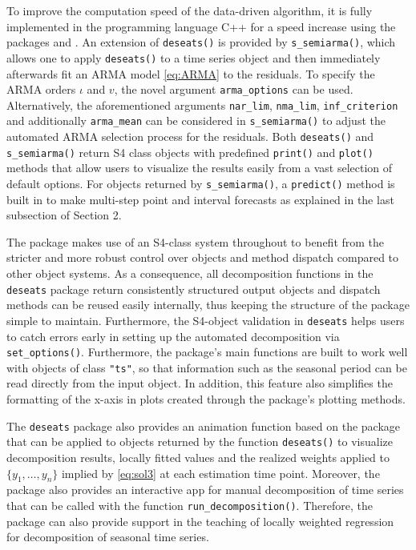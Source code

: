 To improve the computation speed of the data-driven algorithm, it is fully implemented in the programming language C++ for a speed increase using the packages  \citep{eddelbuettel2011rcpp} and  \citep{eddelbuettel2014armadillo}. An extension of \texttt{deseats()} is provided by \texttt{s\_semiarma()}, which allows one to apply \texttt{deseats()} to a time series object and then immediately afterwards fit an ARMA model \eqref{eq:ARMA} to the residuals. To specify the ARMA orders \(\iota\) and \(v\), the novel argument \texttt{arma\_options} can be used. Alternatively, the aforementioned arguments \texttt{nar\_lim}, \texttt{nma\_lim}, \texttt{inf\_criterion} and additionally \texttt{arma\_mean} can be considered in \texttt{s\_semiarma()} to adjust the automated ARMA selection process for the residuals. Both \texttt{deseats()} and \texttt{s\_semiarma()} return S4 class objects with predefined \texttt{print()} and \texttt{plot()} methods that allow users to visualize the results easily from a vast selection of default options. For objects returned by \texttt{s\_semiarma()}, a \texttt{predict()} method is built in to make multi-step point and interval forecasts as explained in the last subsection of Section 2.

The package makes use of an S4-class system throughout to benefit from the stricter and more robust control over objects and method dispatch compared to other object systems. As a consequence, all decomposition functions in the \texttt{deseats} package return consistently structured output objects and dispatch methods can be reused easily internally, thus keeping the structure of the package simple to maintain. Furthermore, the S4-object validation in \texttt{deseats} helps users to catch errors early in setting up the automated decomposition via \texttt{set\_options()}. Furthermore, the package's main functions are built to work well with objects of class \texttt{"ts"}, so that information such as the seasonal period can be read directly from the input object. In addition, this feature also simplifies the formatting of the x-axis in plots created through the package's plotting methods.

The \texttt{deseats} package also provides an animation function based on the  \citep{xie2013animation} package that can be applied to objects returned by the function \texttt{deseats()} to visualize decomposition results, locally fitted values and the realized weights applied to \(\{y_1,\dots,y_n\}\) implied by \eqref{eq:sol3} at each estimation time point. Moreover, the package also provides an interactive  \citep{chang2021shiny} app for manual decomposition of time series that can be called with the function \texttt{run\_decomposition()}. Therefore, the package can also provide support in the teaching of locally weighted regression for decomposition of seasonal time series.


